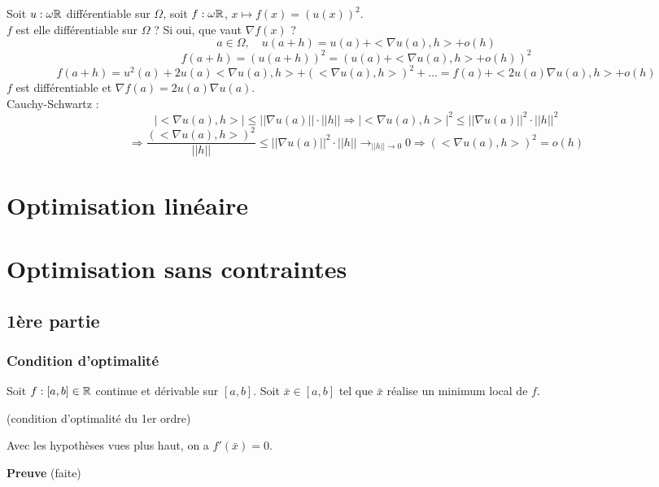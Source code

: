 		\begin{exemple}
		
		Soit $u: \omega \mathbb{R}$ différentiable sur $\Omega$, soit $f: \omega \mathbb{R}$, $ x \mapsto f(x) = (u(x))^2$.\\
		$f$ est elle différentiable sur $\Omega$ ? Si oui, que vaut $ \nabla f(x)$ ?
		\[a \in \Omega, \quad u(a+h) = u(a) + <\nabla u(a), h> + o(h)\]
		\[f(a+h) = (u(a+h))^2 = (u(a) + <\nabla u(a), h> + o(h))^2 \]
		\[f(a+h) = u^2(a) + 2u(a)<\nabla u(a), h> +(<\nabla u(a), h>)^2 + \dots = f(a) + <2u(a)\nabla u(a), h> + o(h)\]
		$f$ est différentiable et $\nabla f(a) = 2u(a) \nabla u(a)$.\\
		Cauchy-Schwartz : \[|<\nabla u(a), h>| \leq ||\nabla u(a)|| \cdot ||h|| \Rightarrow |<\nabla u(a), h>|^2 \leq ||\nabla u(a)||^2 \cdot ||h||^2 \]
		\[ \Rightarrow \frac{ (<\nabla u(a), h>)^2 }{||h||} \leq ||\nabla u(a)||^2 \cdot ||h|| \rightarrow_{||h|| \rightarrow 0} 0 \Rightarrow (< \nabla u(a), h>)^2 = o(h)\]
		\end{exemple}
		
\section{Optimisation linéaire}
		
		
\section{Optimisation sans contraintes}

	\subsection{1ère partie}
	
		\subsubsection{Condition d'optimalité}
		
		Soit $f : [a, b] \in \mathbb{R}$ continue et dérivable sur $[a,  b]$.
		Soit $\bar{x} \in [a, b]$ tel que $\bar{x}$ réalise un minimum local de $f$.
		
		\begin{theoreme} (condition d'optimalité du 1er ordre)
		
		Avec les hypothèses vues plus haut, on a $f'(\bar{x}) = 0$.
		\end{theoreme}
		
		\textbf{Preuve} (faite)
		
